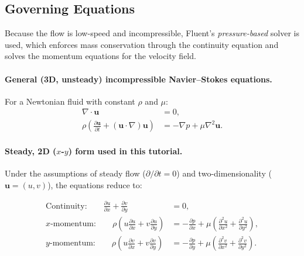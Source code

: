\subsection{Governing Equations}
Because the flow is low-speed and incompressible, Fluent's \textit{pressure-based} solver is used, which enforces mass conservation through the continuity equation and solves the momentum equations for the velocity field.

\paragraph{General (3D, unsteady) incompressible Navier--Stokes equations.}
For a Newtonian fluid with constant $\rho$ and $\mu$:
\begin{align}
    \nabla \cdot \mathbf{u} &= 0, \label{eq:cont_general}\\
    \rho\left(\frac{\partial \mathbf{u}}{\partial t} + (\mathbf{u}\cdot\nabla)\mathbf{u}\right) &= -\nabla p + \mu \nabla^2 \mathbf{u}. \label{eq:ns_general}
\end{align}

\paragraph{Steady, 2D ($x$-$y$) form used in this tutorial.}
Under the assumptions of steady flow ($\partial/\partial t=0$) and two-dimensionality ($\mathbf{u}=(u,v)$), the equations reduce to:

\begin{align}
    \text{Continuity:}\qquad 
    \frac{\partial u}{\partial x} + \frac{\partial v}{\partial y} &= 0, 
    \label{eq:cont_2d}\\[6pt]
    \text{$x$-momentum:}\qquad
    \rho\left(u\frac{\partial u}{\partial x} + v\frac{\partial u}{\partial y}\right) &=
    -\frac{\partial p}{\partial x}
    + \mu\left(\frac{\partial^2 u}{\partial x^2} + \frac{\partial^2 u}{\partial y^2}\right),
    \label{eq:xmom_2d}\\[6pt]
    \text{$y$-momentum:}\qquad
    \rho\left(u\frac{\partial v}{\partial x} + v\frac{\partial v}{\partial y}\right) &=
    -\frac{\partial p}{\partial y}
    + \mu\left(\frac{\partial^2 v}{\partial x^2} + \frac{\partial^2 v}{\partial y^2}\right).
    \label{eq:ymom_2d}
    \end{align}